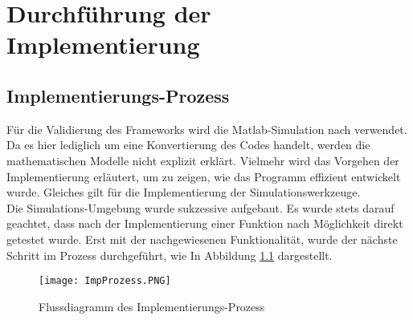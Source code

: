 \chapter{Durchführung der Implementierung}
\section{Implementierungs-Prozess}
Für die Validierung des Frameworks wird die Matlab-Simulation nach \cite{Olucak.15.02.2017} verwendet. Da es hier lediglich um eine Konvertierung des Codes handelt, werden die mathematischen Modelle nicht explizit erklärt. Vielmehr wird das Vorgehen der Implementierung erläutert, um zu zeigen, wie das Programm effizient entwickelt wurde. Gleiches gilt für die Implementierung der Simulationswerkzeuge.\\
 Die Simulations-Umgebung wurde sukzessive aufgebaut. Es wurde stets darauf geachtet, dass nach der Implementierung einer Funktion nach Möglichkeit direkt getestet wurde. Erst mit der nachgewiesenen Funktionalität, wurde der nächste Schritt im Prozess durchgeführt, wie In Abbildung \ref{fig: ImpProzess} dargestellt.
\begin{figure}[h]
	\texttt{[image: ImpProzess.PNG]}
	\caption{Flussdiagramm des Implementierungs-Prozess}
	\label{fig: ImpProzess}
\end{figure}
